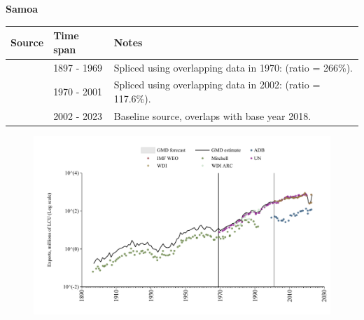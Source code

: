 \documentclass[12pt,a4paper,landscape]{article}
\begin{document}
\begin{adjustbox}{max totalsize={\paperwidth}{\paperheight},center}
\begin{minipage}[t][\textheight][t]{\textwidth}
\vspace*{0.5cm}
{}
\begin{center}
{\Large\bfseries Samoa}
\end{center}
\vspace{0.5cm}
\begin{table}[H]
\centering
\small
\begin{tabular}{|l|l|l|}
\hline
\textbf{Source} & \textbf{Time span} & \textbf{Notes} \\
\hline
\rowcolor{white}\cite{Mitchell}& 1897 - 1969 &Spliced using overlapping data in 1970: (ratio = 266\%).\\
\rowcolor{lightgray}\cite{UN}& 1970 - 2001 &Spliced using overlapping data in 2002: (ratio = 117.6\%).\\
\rowcolor{white}\cite{WDI}& 2002 - 2023 &Baseline source, overlaps with base year 2018.\\
\hline
\end{tabular}
\end{table}
\begin{figure}[H]
\centering
\includegraphics[width=\textwidth,height=0.6\textheight,keepaspectratio]{graphs/WSM_exports.pdf}
\end{figure}
\end{minipage}
\end{adjustbox}
\end{document}
